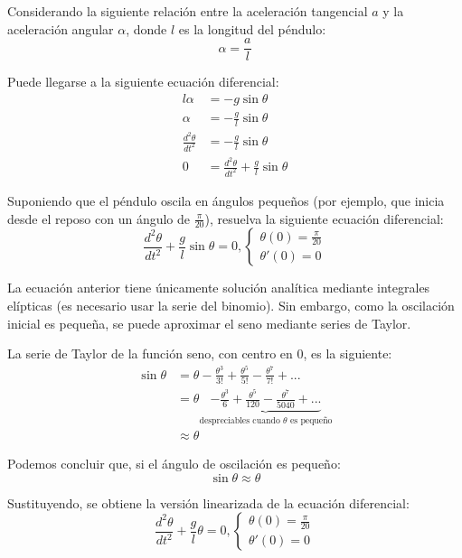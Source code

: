 \begin{ex}
    Considerando la siguiente relación entre la aceleración tangencial $a$ y la
    aceleración angular $\alpha$, donde $l$ es la longitud del péndulo:
    \[
        \alpha = \frac{a}{l}
    \]

    Puede llegarse a la siguiente ecuación diferencial:
    \begin{align*}
        l \alpha &= -g \sin \theta\\
        \alpha &= -\frac{g}{l} \sin \theta \\
        \frac{d^2 \theta}{dt^2} &= -\frac{g}{l} \sin \theta \\
        0 &= \frac{d^2 \theta}{dt^2} + \frac{g}{l} \sin \theta
    \end{align*}

    Suponiendo que el péndulo oscila en ángulos pequeños (por ejemplo, que
    inicia desde el reposo con un ángulo de $\frac{\pi}{20}$), resuelva la
    siguiente ecuación diferencial:
    \[
        \frac{d^2 \theta}{dt^2} + \frac{g}{l} \sin \theta = 0,
        \begin{cases}
            \theta(0) = \frac{\pi}{20}\\
            \theta'(0) = 0
        \end{cases}
    \]

    \begin{solution}

        La ecuación anterior tiene únicamente solución analítica mediante
        integrales elípticas (es necesario usar la serie del binomio). Sin
        embargo, como la oscilación inicial es pequeña, se puede aproximar el
        seno mediante series de Taylor.

        La serie de Taylor de la función seno, con centro en 0, es la siguiente:
        \begin{align*}
            \sin \theta &= \theta - \frac{\theta^3}{3!} + \frac{\theta^5}{5!} - \frac{\theta^7}{7!} + ... \\  
                        &= \theta \underbrace{- \frac{\theta^3}{6} + \frac{\theta^5}{120} - \frac{\theta^7}{5040} + ...}_{\text{despreciables cuando } \theta \text{ es pequeño}} \\
                        &\approx \theta
        \end{align*}

        Podemos concluir que, si el ángulo de oscilación es pequeño:
        \[
            \sin \theta \approx \theta
        \]

        Sustituyendo, se obtiene la versión linearizada de la ecuación
        diferencial:
        \[
                \frac{d^2 \theta}{dt^2} + \frac{g}{l} \theta = 0,
                \begin{cases}
                    \theta(0) = \frac{\pi}{20}\\
                    \theta'(0) = 0
                \end{cases}
        \]


\end{solution}
\end{ex}
